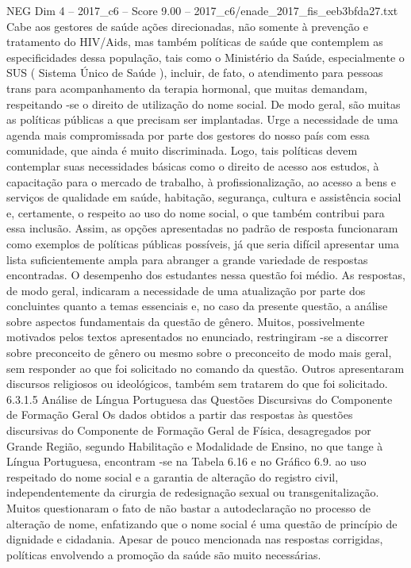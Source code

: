 \begin{textsample}{NEG Dim 4 – 2017\_c6 – Score 9.00 – 2017\_c6/enade\_2017\_fis\_eeb3bfda27.txt}
Cabe aos gestores de saúde ações direcionadas, não somente à prevenção e tratamento do HIV/Aids, mas também políticas de saúde que contemplem as especificidades dessa população, tais como o Ministério da Saúde, especialmente o SUS ( Sistema Único de Saúde ), incluir, de fato, o atendimento para pessoas trans para acompanhamento da terapia hormonal, que muitas demandam, respeitando -se o direito de utilização do nome social.
De modo geral, são muitas as políticas públicas a que precisam ser implantadas.
Urge a necessidade de uma agenda mais compromissada por parte dos gestores do nosso país com essa comunidade, que ainda é muito discriminada.
Logo, tais políticas devem contemplar suas necessidades básicas como o direito de acesso aos estudos, à capacitação para o mercado de trabalho, à profissionalização, ao acesso a bens e serviços de qualidade em saúde, habitação, segurança, cultura e assistência social e, certamente, o respeito ao uso do nome social, o que também contribui para essa inclusão.
Assim, as opções apresentadas no padrão de resposta funcionaram como exemplos de políticas públicas possíveis, já que seria difícil apresentar uma lista suficientemente ampla para abranger a grande variedade de respostas encontradas.
O desempenho dos estudantes nessa questão foi médio.
As respostas, de modo geral, indicaram a necessidade de uma atualização por parte dos concluintes quanto a temas essenciais e, no caso da presente questão, a análise sobre aspectos fundamentais da questão de gênero.
Muitos, possivelmente motivados pelos textos apresentados no enunciado, restringiram -se a discorrer sobre preconceito de gênero ou mesmo sobre o preconceito de modo mais geral, sem responder ao que foi solicitado no comando da questão.
Outros apresentaram discursos religiosos ou ideológicos, também sem tratarem do que foi solicitado. 6.3.1.5 Análise de Língua Portuguesa das Questões Discursivas do Componente de Formação Geral Os dados obtidos a partir das respostas às questões discursivas do Componente de Formação Geral de Física, desagregados por Grande Região, segundo Habilitação e Modalidade de Ensino, no que tange à Língua Portuguesa, encontram -se na Tabela 6.16 e no Gráfico 6.9. ao uso respeitado do nome social e a garantia de alteração do registro civil, independentemente da cirurgia de redesignação sexual ou transgenitalização.
Muitos questionaram o fato de não bastar a autodeclaração no processo de alteração de nome, enfatizando que o nome social é uma questão de princípio de dignidade e cidadania.
Apesar de pouco mencionada nas respostas corrigidas, políticas envolvendo a promoção da saúde são muito necessárias.

\end{textsample}
